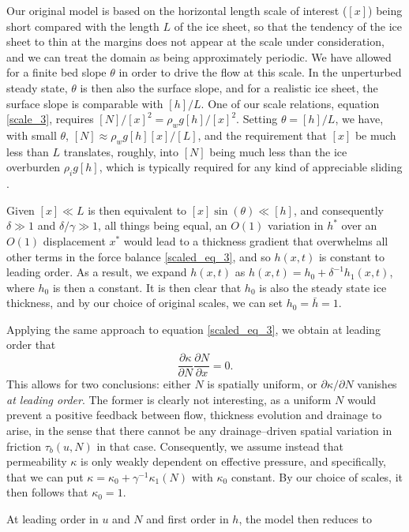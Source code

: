 \documentclass[journal abbreviation, manuscript]{copernicus}
\begin{document}
Our original model is based on the horizontal length scale of 
interest ($[x]$) being short compared 
with the length $L$ of the ice sheet, so that the tendency of the ice 
sheet to thin at the margins does not appear at 
the scale under consideration, and we can treat the domain as being 
approximately periodic. We have allowed for a finite bed slope $\theta$ 
in order to drive the flow at this scale. In the unperturbed steady 
state, $\theta$ is then also the surface slope, and for a realistic ice 
sheet, the surface slope is comparable with $[h]/L$. One of our scale 
relations, equation \eqref{scale_3}, requires ${[N]}/{[x]^2} = \rho_w g {[h]}/{[x]^2}$. 
Setting $\theta = [h]/L$, we have, with small $\theta$, $[N] \approx 
\rho_w g [h] [x]/[L]$, and the requirement that $[x]$ be much less than 
$L$ translates, roughly, into $[N]$ being much less than the ice 
overburden $\rho_i g[h]$, which is typically required for any kind of 
appreciable sliding \citep{schoof2006variational}.

Given $[x] \ll L$ is then equivalent to $[x]\sin(\theta) \ll [h]$, and 
consequently $\delta \gg 1$ and $\delta/\gamma \gg 1$, all things being equal, an $O(1)$ variation in $h^*$ over an $O(1)$ displacement $x^*$ would lead to a thickness 
gradient that overwhelms all other terms in the force balance \eqref{scaled_eq_3}, and so $h(x, t)$ is constant to leading order.
As a result, we expand $h(x, t)$ as $h(x, t) = h_0 + \delta^{-1} h_1(x, 
t)$, where $h_0$ is then a constant. It is then clear that 
$h_0$ is also the steady state ice thickness, and by our choice of
original scales, we can set $h_0 = \bar{h} = 1$.


Applying the same approach to equation \eqref{scaled_eq_3}, we obtain at leading 
order that
$$ \frac{\partial \kappa}{\partial N} \frac{\partial N}{\partial x} = 0.$$
This allows for two conclusions: either $N$ is spatially uniform, or 
$\partial \kappa / \partial N$ vanishes \emph{at leading order}. The 
former is clearly not interesting, as a uniform $N$ would prevent a 
positive feedback between flow, thickness evolution and drainage to 
arise, in the sense that there cannot be any drainage--driven spatial 
variation in friction $\tau_b(u,N)$ in that case. Consequently, we 
assume instead that permeability $\kappa$ is only weakly dependent on
effective pressure, and specifically, that we can put $\kappa = \kappa_0 
+ \gamma^{-1}  \kappa_1(N)$ with $\kappa_0$ constant. By our choice of 
scales, it then follows that $\kappa_0 = 1$.

At leading 
order in $u$ and $N$ and first order in $h$, the model then reduces to
\end{document}

